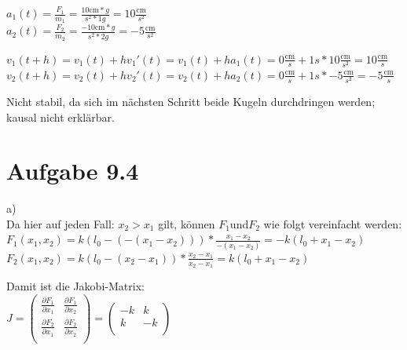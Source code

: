 \documentclass{article}
\begin{document}
\(a_1(t)=\frac{F_1}{m_1}=\frac{10\text{cm} *g}{s^2*1 g}=10 \frac{\text{cm}}{s^2}\)\\
\(a_2(t)=\frac{F_2}{m_2}=\frac{-10\text{cm} *g}{s^2*2 g}=-5 \frac{\text{cm}}{s^2}\)

\(v_1(t+h)=v_1(t)+h v_1'(t)=v_1(t)+h a_1(t)=0\frac{\text{cm}}{s}+1s*10\frac{\text{cm}}{s^2}=10\frac{\text{cm}}{s}\)\\
\(v_2(t+h)=v_2(t)+h v_2'(t)=v_2(t)+h a_2(t)=0\frac{\text{cm}}{s}+1s*-5\frac{\text{cm}}{s^2}=-5\frac{\text{cm}}{s}\)

Nicht stabil, da sich im n{\" a}chsten Schritt beide Kugeln durchdringen werden; kausal nicht erkl{\" a}rbar.

\section*{Aufgabe 9.4}

a)\\
Da hier auf jeden Fall: \(x_2>x_1\) gilt, k{\" o}nnen \(F_1 \text{und} F_2\) wie folgt vereinfacht werden:\\
\(F_1\left(x_1, x_2\right)=k\left(l_0-\left(-\left(x_1-x_2\right)\right)\right)*\frac{x_1-x_2}{-\left(x_1-x_2\right)}=-k\left(l_0+x_1-x_2\right)\)\\
\(F_2\left(x_1, x_2\right)=k\left(l_0-\left(x_2-x_1\right)\right)*\frac{x_2-x_1}{x_2-x_1}=k\left(l_0+x_1-x_2\right)\)

Damit ist die Jakobi-Matrix:\\
\(J=\left(
\begin{array}{cc}
 \frac{\partial F_1}{\partial x_1} & \frac{\partial F_1}{\partial x_2} \\
 \frac{\partial F_2}{\partial x_1} & \frac{\partial F_2}{\partial x_2} \\
\end{array}
\right)=\left(
\begin{array}{cc}
 -k & k \\
 k & -k \\
\end{array}
\right)\)
\end{document}

